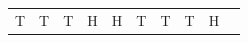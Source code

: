 {\begin{center}
\begin{xtabular*}{\mytablewidth}[t]{|p{10\mystarwidth}|p{10\mystarwidth}|p{10\mystarwidth}|p{10\mystarwidth}|p{10\mystarwidth}|p{10\mystarwidth}|p{10\mystarwidth}|p{10\mystarwidth}|p{10\mystarwidth}|p{10\mystarwidth}|}
    
        T &
    
    
        T &
    
    
        T &
    
    
        H &
    
    
        H &
    
    
        T &
    
    
        T &
    
    
        T &
    
    
        H &
    
    

\end{xtabular*}
\end{center}}
